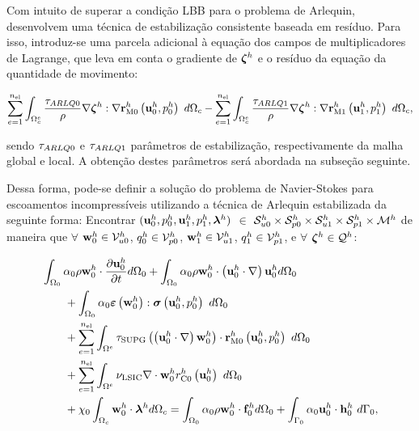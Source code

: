 \documentclass[tese_patricia]{subfiles}
\begin{document}
Com intuito de superar a condição LBB para o problema de Arlequin,  desenvolvem uma técnica de estabilização consistente baseada em resíduo. Para isso, introduz-se uma parcela adicional à equação dos campos de multiplicadores de Lagrange, que leva em conta o gradiente de $\boldsymbol{\zeta}^h$ e o resíduo da equação da quantidade de movimento:

\begin{align}
	\sum_{e=1}^{n_{\mathrm{el}}} \int_{\Omega^e_{c}} \frac{\tau_{ARLQ0}}{\rho} \nabla \boldsymbol{\zeta}^h : \nabla \mathbf{r}_{\mathrm{M0}}^{h}\left(\mathbf{u}_0^h,p_0^h \right) \ d\Omega_{c} - 
	\sum_{e=1}^{n_{\mathrm{el}}} \int_{\Omega^e_{c}} \frac{\tau_{ARLQ1}}{\rho} \nabla \boldsymbol{\zeta}^h : \nabla \mathbf{r}_{\mathrm{M1}}^{h}\left(\mathbf{u}_1^h,p_1^h \right) \ d\Omega_{c},
\end{align}

\noindent sendo $\tau_{ARLQ0}$ e $\tau_{ARLQ1}$ parâmetros de estabilização, respectivamente da malha global e local. A obtenção destes parâmetros será abordada na subseção seguinte. 

Dessa forma, pode-se definir a solução do problema de Navier-Stokes para escoamentos incompressíveis utilizando a técnica de Arlequin estabilizada da seguinte forma: Encontrar $(\mathbf{u}_0^h,p_0^h,\mathbf{u}_1^h,p_1^h,\boldsymbol{\lambda}^h)$ $\in$ $\mathcal{S}_{u0}^h \times \mathcal{S}_{p0}^h \times \mathcal{S}_{u1}^h \times \mathcal{S}_{p1}^h \times \mathcal{M}^h$ de maneira que  $\forall$ $\mathbf{w}_0^h \in \mathcal{V}_{u0}^h$, $q_0^h \in \mathcal{V}_{p0}^h$, $\mathbf{w}_1^h \in \mathcal{V}_{u1}^h$, $q_1^h \in \mathcal{V}_{p1}^h$,   e $\forall$ $\boldsymbol{\zeta}^h \in \mathcal{Q}^h$:

\begin{align}
	\begin{split}
		&\int_{\domain_0} \arlequinWFGlobal \density \wglobalh \cdot \frac{\partial\uglobalh}{\partial t} d\domain_{0} +
		\int_{\domain_0} \arlequinWFGlobal \density \wglobalh \cdot  \left(\uglobalh \cdot \nabla\right)\uglobalh d\domain_{0}  \\ 
		&\qquad+	
		\int_{\domain_{0}} \arlequinWFGlobal \straintensor \left(\wglobalh\right) : \stresstensor \left(\uglobalh,\pglobalh\right)\ d\domain_{0} 
		\\ 
		&\qquad+ \sum_{e=1}^{\nel} \int_{\domainE} \SUPG  \left(\left(\uglobalh \cdot \nabla \right) \wglobalh\right) \cdot \resMomGlobal\left(\uglobalh,\pglobalh \right)\  d\domain_{0} \\ 
		&\qquad+\sum_{e=1}^{\nel} \int_{\domainE} \LSIC \nabla \cdot \wglobalh \resPreGlobal 
		\left(\uglobalh\right)\  d\domain_{0} \\
		&\qquad+ \chi_{0} \int_{\domain_c} \wglobalh \cdot \lagrangeMultiplier^{h} d\domain_{c}  = \int_{\domain_0} \arlequinWFGlobal \density \wglobalh \cdot  \sbodyforce_{0}^{h} d\domain_{0} + \int_{\boundary_{0}} \arlequinWFGlobal \uglobalh \cdot \straction_{0}^{h}\ d\boundary_{0}, 
		\label{eq:FinalSystem0est}
	\end{split}
\end{align}
\end{document}
